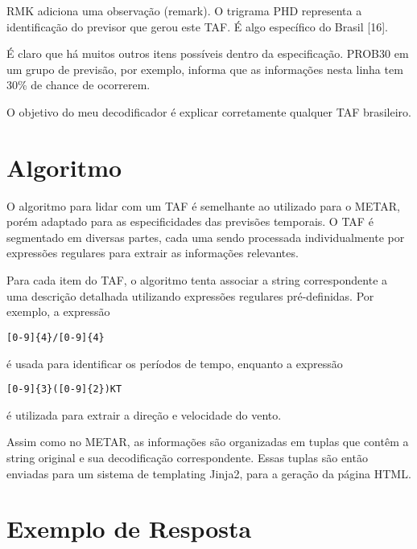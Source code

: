 RMK adiciona uma observação (remark). O trigrama PHD representa a identificação 
do previsor que
gerou este TAF. É algo específico do Brasil [16].

É claro que há muitos outros itens possíveis dentro da especificação. PROB30 em 
um grupo de previsão, por exemplo, informa que as informações nesta linha tem 
30\% de chance de ocorrerem.

O objetivo do meu decodificador é explicar corretamente qualquer TAF brasileiro.


\section{Algoritmo}

O algoritmo para lidar com um TAF é semelhante ao utilizado para o METAR, porém adaptado
para as especificidades das previsões temporais. O TAF é segmentado em diversas
partes, cada uma sendo processada individualmente por expressões regulares para extrair as
informações relevantes.

Para cada item do TAF, o algoritmo tenta associar a string correspondente a uma descrição
detalhada utilizando expressões regulares pré-definidas. Por exemplo, a expressão

\begin{verbatim}
[0-9]{4}/[0-9]{4} 
\end{verbatim}

é usada para identificar os períodos de tempo, enquanto a expressão

\begin{verbatim}
[0-9]{3}([0-9]{2})KT
\end{verbatim}

é utilizada para extrair a direção e velocidade do vento.

Assim como no METAR, as informações são organizadas em tuplas que contêm a string original
e sua decodificação correspondente. Essas tuplas são então enviadas para um sistema de
templating Jinja2, para a geração da página HTML.

\section{Exemplo de Resposta}


